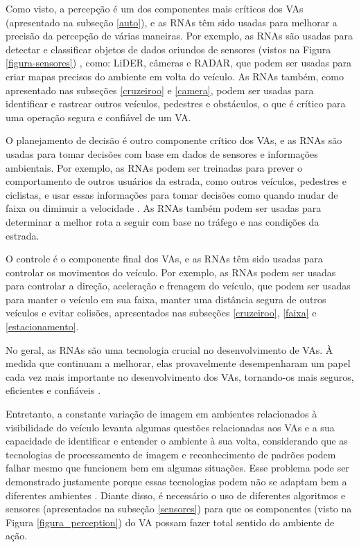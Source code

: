 Como visto, a percepção é um dos componentes mais críticos dos VAs (apresentado na subseção \ref{auto}), e as RNAs têm sido usadas para melhorar a precisão da percepção de várias maneiras. 
Por exemplo, as  RNAs são usadas para detectar e classificar objetos de dados oriundos de sensores (vistos na Figura \ref{figura-sensores}) , como: LiDER, câmeras e RADAR, que podem ser usadas para criar mapas precisos do ambiente em volta do veículo. 
As RNAs também, como apresentado nas subseções \ref{cruzeiroo} e \ref{camera}, podem ser usadas para identificar e rastrear outros veículos, pedestres e obstáculos, o que é crítico para uma operação segura e confiável de um VA.

O planejamento de decisão é outro componente crítico dos VAs, e as  RNAs são usadas para tomar decisões com base em dados de sensores e informações ambientais. Por exemplo, as RNAs podem ser treinadas para prever o comportamento de outros usuários da estrada, como outros veículos, pedestres e ciclistas, e usar essas informações para tomar decisões como quando mudar de faixa ou diminuir a velocidade \cite{aplicacao2}. As RNAs também podem ser usadas para determinar a melhor rota a seguir com base no tráfego e nas condições da estrada. 

O controle é o componente final dos VAs, e as RNAs têm sido usadas para controlar os movimentos do veículo. Por exemplo, as  RNAs podem ser usadas para controlar a direção, aceleração e frenagem do veículo, que podem ser usadas para manter o veículo em sua faixa, manter uma distância segura de outros veículos e evitar colisões, apresentados nas subseções \ref{cruzeiroo}, \ref{faixa} e \ref{estacionamento}.

No geral, as RNAs são uma tecnologia crucial no desenvolvimento de VAs. À medida que continuam a melhorar, elas provavelmente desempenharam um papel cada vez mais importante no desenvolvimento dos VAs, tornando-os mais seguros, eficientes e confiáveis \cite{sensors-yet, aplicacao2}.

Entretanto, a constante variação de imagem em ambientes relacionados à visibilidade do veículo levanta algumas questões relacionadas aos VAs e a sua capacidade de identificar e entender o ambiente à sua volta, considerando que as tecnologias de processamento de imagem e reconhecimento de padrões podem falhar mesmo que funcionem bem em algumas situações. Esse problema pode ser demonstrado justamente porque essas tecnologias podem não se adaptam bem a diferentes ambientes \cite{caio}. Diante disso, é necessário o uso de diferentes algoritmos e sensores (apresentados na subseção \ref{sensores}) para que os componentes (visto na Figura \ref{figura_perception}) do VA possam fazer total sentido do ambiente de ação.

